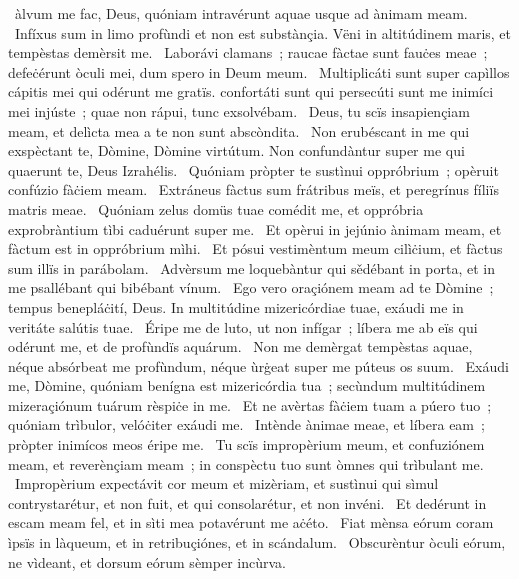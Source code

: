 { }
{%
~àlvum me fac, Deus, quóniam intravérunt aquae usque ad ànimam meam. 
~Infíxus sum in limo profùndi et non est substànçia. Vëni in altitúdinem maris, et tempèstas demèrsit me. 
~Laborávi clamans~; raucae fàctae sunt fauċes meae~; defeċérunt òculi mei, dum spero in Deum meum. 
~Multiplicáti sunt super capìllos cápitis mei qui odérunt me gratïs. confortáti sunt qui persecúti sunt me inimíci mei injúste~; quae non rápui, tunc exsolvébam. 
~Deus, tu scïs insapiençiam meam, et delìcta mea a te non sunt abscòndita. 
~Non erubéscant in me qui exspèctant te, Dòmine, Dòmine virtútum. Non confundàntur super me qui quaerunt te, Deus Izrahélis. 
~Quóniam pròpter te sustìnui oppróbrium~; opèruit confúzio fàċiem meam. 
~Extráneus fàctus sum frátribus meïs, et peregrínus fíliïs matris meae. 
~Quóniam zelus domüs tuae comédit me, et oppróbria exprobràntium tìbi caduérunt super me. 
~Et opèrui in jejúnio ànimam meam, et fàctum est in oppróbrium mìhi. 
~Et pósui vestimèntum meum cilìċium, et fàctus sum illïs in parábolam. 
~Advèrsum me loquebàntur qui sědébant in porta, et in me psallébant qui bibébant vínum. 
~Ego vero oraçiónem meam ad te Dòmine~; tempus benepláċití, Deus. In multitúdine mizericórdiae tuae, exáudi me in veritáte salútis tuae. 
~Éripe me de luto, ut non infígar~; líbera me ab eïs qui odérunt me, et de profùndïs aquárum. 
~Non me demèrgat tempèstas aquae, néque absórbeat me profùndum, néque ùrġeat super me púteus os suum. 
~Exáudi me, Dòmine, quóniam benígna est mizericórdia tua~; secùndum multitúdinem mizeraçiónum tuárum rèspiċe in me. 
~Et ne avèrtas fàċiem tuam a púero tuo~; quóniam trìbulor, velóċiter exáudi me. 
~Intènde ànimae meae, et líbera eam~; pròpter inimícos meos éripe me. 
~Tu scïs impropèrium meum, et confuziónem meam, et reverènçiam meam~; in conspèctu tuo sunt òmnes qui trìbulant me. 
~Impropèrium expectávit cor meum et mizèriam, et sustìnui qui sìmul contrystarétur, et non fuit, et qui consolarétur, et non invéni. 
~Et dedérunt in escam meam fel, et in sìti mea potavérunt me aċéto. 
~Fiat mènsa eórum coram ìpsïs in làqueum, et in retribuçiónes, et in scándalum. 
~Obscurèntur òculi eórum, ne vìdeant, et dorsum eórum sèmper incùrva. 
}
